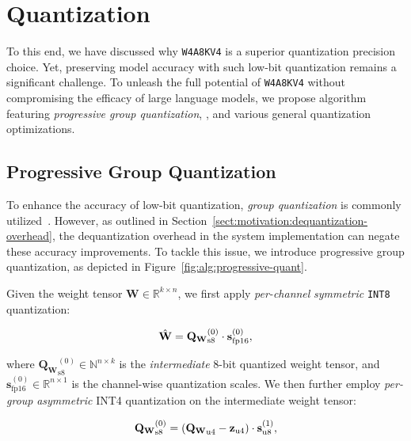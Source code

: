 \section{\algo Quantization}
\label{sect:algorithm}
To this end, we have discussed why \texttt{W4A8KV4} is a superior quantization precision choice. Yet, preserving model accuracy with such low-bit quantization remains a significant challenge. To unleash the full potential of  \texttt{W4A8KV4} without compromising the efficacy of large language models, we propose \algo algorithm featuring \textit{progressive group quantization}, \textit{\smoothattention}, and various general quantization optimizations. 

\subsection{Progressive Group Quantization}
\label{sect:alg:progressive-quant}

To enhance the accuracy of low-bit quantization, \textit{group quantization} is commonly utilized~\cite{zhao2023atom,lin2023awq,gptq}. However, as outlined in Section~\ref{sect:motivation:dequantization-overhead}, the dequantization overhead in the system implementation can negate these accuracy improvements. To tackle this issue, we introduce progressive group quantization, as depicted in Figure~\ref{fig:alg:progressive-quant}.

Given the weight tensor $\mathbf{W} \in \mathbb{R}^{k \times n}$, we first apply \textit{per-channel} \textit{symmetric} \texttt{INT8} quantization:

\vspace{-10pt}
\begin{equation}
    \small \hat{\mathbf{W}} = {\mathbf{Q}_{\mathbf{W}}}^{(0)}_{\mathrm{s8}} \cdot \mathbf{s}^{(0)}_{\mathrm{fp16}},
    \label{eqn:alg:progressive_quant:int8}
\end{equation}
\vspace{-18pt}

where ${\mathbf{Q}_{\mathbf{W}}}_{\mathrm{s8}}^{(0)} \in \mathbb{N}^{n \times k}$ is the \textit{intermediate} 8-bit quantized weight tensor, and $\mathbf{s}^{(0)}_{\mathrm{fp16}} \in \mathbb{R}^{n \times 1}$ is the channel-wise quantization scales. We then further employ \textit{per-group} \textit{asymmetric} INT4 quantization on the intermediate weight tensor:

\vspace{-10pt}
\begin{equation}
 \small {{\mathbf{Q}}_{\mathbf{W}}}_\mathrm{s8}^{(0)} = \left({\mathbf{Q}_{\mathbf{W}}}_{\mathrm{u4}} - \mathbf{z}_{\mathrm{u4}} \right)\cdot \mathbf{s}^{(1)}_{\mathrm{u8}},
    \label{eqn:alg:progressive_quant:int4}
\end{equation}
\vspace{-18pt}


